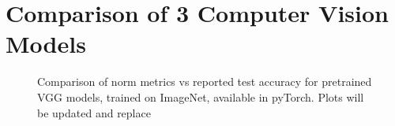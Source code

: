 \section{Comparison of 3 Computer Vision Models}
\label{sxn:cv}

\begin{figure}[t]
    \centering
    \qquad
    \qquad
    \qquad
    \caption{Comparison of norm metrics vs reported test accuracy for pretrained VGG models, trained on ImageNet, available in pyTorch.  Plots will be updated and replace }
    

    \label{fig:vgg-metrics}
\end{figure}


